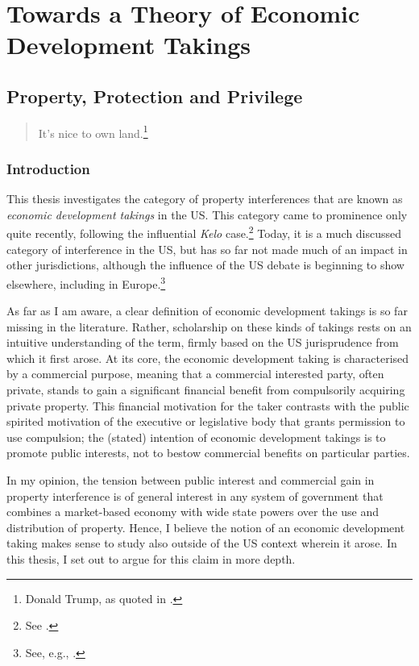 \newcommand{\isr}[1]{{#1}}

\part{Towards a Theory of Economic Development Takings}

\chapter{Property, Protection and Privilege}\label{chap:1}

\begin{quote}
It's nice to own land.\footnote{Donald Trump, as quoted in \cite{booth12}.}
\end{quote}

\section{Introduction}

This thesis investigates the category of property interferences that are known as {\it economic development takings} in the US. This category came to prominence only quite recently, following the influential {\it Kelo} case.\footnote{See \cite{kelo05}.} Today, it is a much discussed category of interference in the US, but has so far not made much of an impact in other jurisdictions, although the influence of the US debate is beginning to show elsewhere, including in Europe.\footnote{See, e.g., \cite{verstappen14}.}

As far as I am aware, a clear definition of economic development takings is so far missing in the literature. Rather, scholarship on these kinds of takings rests on an intuitive understanding of the term, firmly based on the US jurisprudence from which it first arose. At its core, the economic development taking is characterised by a commercial purpose, meaning that a commercial interested party, often private, stands to gain a significant financial benefit from compulsorily acquiring private property. This financial motivation for the taker contrasts with the   
public spirited motivation of the executive or legislative body that grants permission to use compulsion; the (stated) intention of economic development takings is to promote public interests, not to bestow commercial benefits on particular parties.

In my opinion, the tension between public interest and commercial gain in property interference is of general interest in any system of government that combines a market-based economy with wide state powers over the use and distribution of property. Hence, I believe the notion of an economic development taking makes sense to study also outside of the US context wherein it arose. In this thesis, I set out to argue for this claim in more depth. 

